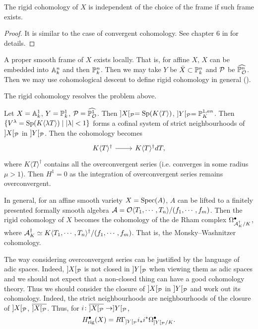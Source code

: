 \begin{proposition}
    The rigid cohomology of $X$ is independent of the choice of the frame if such frame exists.
\end{proposition}

\begin{proof}
    It is similar to the case of convergent cohomology. 
    See chapter 6 in \cite{St} for details.
\end{proof}

\begin{remark}
    A proper smooth frame of $X$ exists locally. 
    That is, for affine $X$, $X$ can be embedded into ${\mathbb {A}}_k^n$ and then ${\mathbb {P}}_k^n$. 
    Then we may take $Y$ be $\bar{X} \subset {\mathbb {P}}_k^n$ and ${\mathcal {P}}$ be $\widehat{{\mathbb {P}}_{\mathcal {O}}^n}$. 
    Then we may use cohomological descent to define rigid cohomology in general (\cite{Tsu}).
\end{remark}

The rigid cohomology resolves the problem above.
\begin{example}
    Let $X = {\mathbb {A}}_k^1$, $Y = {\mathbb {P}}_k^1$, ${\mathcal {P}} = \widehat{{\mathbb {P}}_{{\mathcal {O}}}^1}$. 
    Then $]X[_{\mathcal {P}} = \operatorname{Sp} (K \langle T \rangle)$, $]Y[_{\mathcal {P}} = {\mathbb {P}}^{1,an}_K$. 
    Then $\{V^\lambda = \operatorname{Sp} (K \langle \lambda T \rangle) \mid |\lambda| < 1 \}$ 
    forms a cofinal system of strict neighbourhoods of $]X[_{\mathcal {P}}$ in $]Y[_{\mathcal {P}}$. 
    Then the cohomology becomes
    \[
        \begin{tikzcd}
            K \langle T \rangle^\dagger \ar[r] & K \langle T \rangle^\dagger dT,
        \end{tikzcd}
    \]
    where $K \langle T \rangle^ \dagger$ contains all the overconvergent series 
    (i.e. converges in some radius $\mu > 1$). 
    Then $H^1 = 0$ as the integration of overconvergent series remains overconvergent.

    In general, for an affine smooth variety $X = \operatorname{Spec} (A)$, 
    $A$ can be lifted to a finitely presented formally smooth algebra 
    ${\mathcal {A}} = {\mathcal {O}} \langle T_1, \cdots, T_n \rangle/(f_1, \cdots, f_m)$. 
    Then the rigid cohomology of $X$ becomes the cohomology of the de Rham complex 
    $\Omega_{{\mathcal {A}}_K^\dagger/K}^\bullet$, 
    where ${\mathcal {A}}_K^\dagger \simeq K \langle T_1, \cdots,T_n \rangle^\dagger/(f_1, \cdots, f_m)$. 
    That is, the Monsky--Washnitzer cohomology.
\end{example}

\begin{remark}
    The way considering overconvergent series can be justified by the language of adic spaces. 
    Indeed, $]X[_{\mathcal {P}}$ is not closed in $]Y[_{\mathcal {P}}$ when viewing them as adic spaces 
    and we should not expect that a non-closed thing can have a good cohomology theory. 
    Thus we should consider the closure of $]X[_{\mathcal {P}}$ in $]Y[_{\mathcal {P}}$ and work out its cohomology. 
    Indeed, the strict neighbourhoods are neighbourhoods of the closure of $]X[_{\mathcal {P}}$, $\overline{]X[_{\mathcal {P}}}$. 
    Thus, for $i \colon \overline{]X[_{\mathcal {P}}} \to ]Y[_{\mathcal {P}}$,
    \[
        H^\bullet_{\mathrm{rig}}(X) = R\Gamma_{]Y[_{\mathcal {P}}} i_* i^* \Omega_{]Y[_{\mathcal {P}}/K}^\bullet.
    \]
\end{remark}

